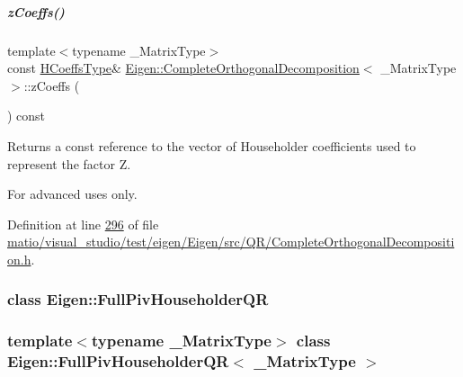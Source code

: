 \mbox{\label{group___q_r___module_a0b28c24992d313d4b04d109dcc7e5220}} 
\subparagraph{\texorpdfstring{z\+Coeffs()}{zCoeffs()}\hspace{0.1cm}{\footnotesize\ttfamily [2/2]}}
{\footnotesize\ttfamily template$<$typename \+\_\+\+Matrix\+Type$>$ \\
const \hyperlink{class_eigen_1_1internal_1_1_tensor_lazy_evaluator_writable}{H\+Coeffs\+Type}\& \hyperlink{group___q_r___module_class_eigen_1_1_complete_orthogonal_decomposition}{Eigen\+::\+Complete\+Orthogonal\+Decomposition}$<$ \+\_\+\+Matrix\+Type $>$\+::z\+Coeffs (\begin{DoxyParamCaption}{ }\end{DoxyParamCaption}) const\hspace{0.3cm}{\ttfamily [inline]}}

\begin{DoxyReturn}{Returns}
a const reference to the vector of Householder coefficients used to represent the factor {\ttfamily Z}.
\end{DoxyReturn}
For advanced uses only. 

Definition at line \hyperlink{matio_2visual__studio_2test_2eigen_2_eigen_2src_2_q_r_2_complete_orthogonal_decomposition_8h_source_l00296}{296} of file \hyperlink{matio_2visual__studio_2test_2eigen_2_eigen_2src_2_q_r_2_complete_orthogonal_decomposition_8h_source}{matio/visual\+\_\+studio/test/eigen/\+Eigen/src/\+Q\+R/\+Complete\+Orthogonal\+Decomposition.\+h}.

\label{class_eigen_1_1_full_piv_householder_q_r}
\subsubsection{class Eigen\+:\+:Full\+Piv\+Householder\+QR}
\subsubsection*{template$<$typename \+\_\+\+Matrix\+Type$>$\newline
class Eigen\+::\+Full\+Piv\+Householder\+Q\+R$<$ \+\_\+\+Matrix\+Type $>$}


